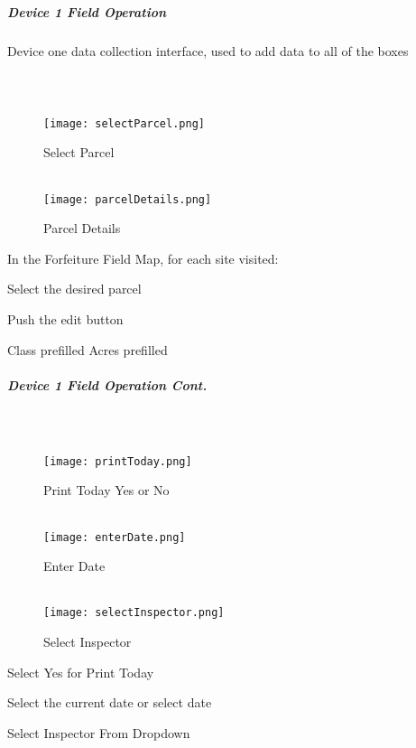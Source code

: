 \documentclass[class=article , crop=false, titlepage, twoside, multi={itemize, figure, verbatim}, float=false]{standalone}
\begin{document}
\clearpage
\subparagraph{Device 1 Field Operation}Device one data collection interface, used to add data to all of the boxes
\subparagraph*{\\}
\begin{wrapfigure}{r}{0.5\textwidth}
\centering
\texttt{[image: selectParcel.png]}
\caption {Select Parcel}
\vspace{.25in}
\HRule \\[.4cm] %
\vspace{.25in}
\texttt{[image: parcelDetails.png]}
\caption{Parcel Details}
\end{wrapfigure}
\vspace{1in}

In the Forfeiture Field Map, for each site visited:\\
\vspace{1in}

Select the desired parcel
\vspace{3in}

Push the edit button 

\clearpage
Class prefilled
Acres prefilled

\clearpage
\subparagraph*{Device 1 Field Operation Cont.}
\subparagraph*{\\}
\begin{wrapfigure}{r}{0.5\textwidth}
\centering
\texttt{[image: printToday.png]}
\caption {Print Today Yes or No}
\vspace{.2in}
\HRule \\[.4cm] %
\vspace{.2in}
\texttt{[image: enterDate.png]}
\caption{Enter Date}
\vspace{.2in}
\HRule \\[.4cm] %
\vspace{.2in}
\texttt{[image: selectInspector.png]}
\caption{Select Inspector}
\end{wrapfigure}
Select Yes for Print Today\\
\vspace{3in}

\noindent Select the current date or select date\\
\vspace{3in}

\noindent Select Inspector From Dropdown\\
\end{document}
